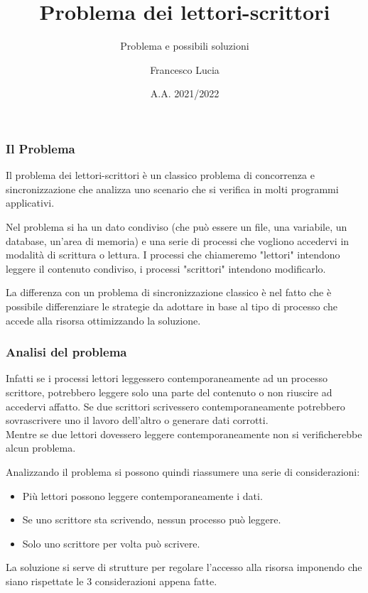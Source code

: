 \documentclass[10pt]{beamer}
\title[Lettori-Scrittori]{Problema dei lettori-scrittori}
\subtitle{Problema e possibili soluzioni}
\author{Francesco Lucia}
\institute[]
{
	Università degli studi della Basilicata \\
	\medskip
}
\date{A.A. 2021/2022}
\begin{document}
	
	\begin{frame}
		\titlepage
	\end{frame}
	\begin{frame}
		\frametitle{Il Problema}
		
		Il problema dei lettori-scrittori è un classico problema di concorrenza e sincronizzazione che analizza uno scenario che si verifica in molti programmi applicativi.
		
		Nel problema si ha un dato condiviso (che può essere un file, una variabile, un database, un'area di memoria) e una serie di processi che vogliono accedervi in modalità di scrittura o lettura. I processi che chiameremo "lettori" intendono leggere il contenuto condiviso, i processi "scrittori" intendono modificarlo.
	
		La differenza con un problema di sincronizzazione classico è nel fatto che è possibile differenziare le strategie da adottare in base al tipo di processo che accede alla risorsa ottimizzando la soluzione.
	\end{frame}

\begin{frame}
	\frametitle{Analisi del problema}
	
	Infatti se i processi lettori leggessero contemporaneamente ad un processo scrittore, potrebbero leggere solo una parte del contenuto o non riuscire ad accedervi affatto. Se due scrittori scrivessero contemporaneamente potrebbero sovrascrivere uno il lavoro dell'altro o generare dati corrotti.\\Mentre se due lettori dovessero leggere contemporaneamente non si verificherebbe alcun problema.
	
	Analizzando il problema si possono quindi riassumere una serie di considerazioni:
	
	\begin{itemize}
		\item Più lettori possono leggere contemporaneamente i dati.
		\item Se uno scrittore sta scrivendo, nessun processo può leggere.
		\item Solo uno scrittore per volta può scrivere.
	\end{itemize}

	La soluzione si serve di strutture per regolare l'accesso alla risorsa imponendo che siano rispettate le 3 considerazioni appena fatte.
\end{frame}

\end{document}
